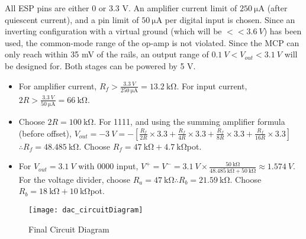 All ESP pins are either 0 or 3.3 V. An amplifier current limit of $\SI{250}{\micro\ampere}$ (after quiescent current),
and a pin limit of $\SI{50}{\micro\ampere}$ per digital input is chosen. Since an inverting configuration with a virtual ground (which will be $<< \SI{3.6}{V}$) has been used,
the common-mode range of the op-amp is not violated. Since the MCP can only reach within 35 mV of the rails, an output range of $\SI{0.1}{V} < V_{out} < \SI{3.1}{V}$ will be designed for.
Both stages can be powered by 5 V.
\begin{itemize}
    \item For amplifier current, $R_f > \frac{\SI{3.3}{V}}{\SI{250}{\micro\ampere}} = \SI{13.2}{\kilo\ohm}$.
          For input current, $2R > \frac{\SI{3.3}{V}}{\SI{50}{\micro\ampere}} = \SI{66}{\kilo\ohm}$. 
    \item Choose $2R = \SI{100}{\kilo\ohm}$. For 1111, and using the summing amplifier formula (before offset),
          $V_{out} = \SI{-3}{V} = -\left[ \frac{R_f}{2R} \times 3.3 + \frac{R_f}{4R} \times 3.3 + \frac{R_f}{8R} \times 3.3 + \frac{R_f}{16R} \times 3.3 \right]$
          $\therefore R_f = \SI{48.485}{\kilo\ohm}$. Choose $R_f = \SI{47}{\kilo\ohm} + \SI{4.7}{\kilo\ohm}$pot.
    \item For $V_{out} = \SI{3.1}{V}$ with 0000 input, $V^+ = V^- = \SI{3.1}{V} \times \frac{\SI{50}{\kilo\ohm}}{\SI{48.485}{\kilo\ohm} + \SI{50}{\kilo\ohm}} \approx \SI{1.574}{V}$.
          For the voltage divider, choose $R_a = \SI{47}{\kilo\ohm} \therefore R_b = \SI{21.59}{\kilo\ohm}$. Choose $R_b = \SI{18}{\kilo\ohm} + \SI{10}{\kilo\ohm}$pot.
\end{itemize}

\begin{figure}[!htb]
  \centering
  \texttt{[image: dac\_circuitDiagram]}
  \caption{Final Circuit Diagram}
  \label{fig:dac_circuitDiagram}
\end{figure}